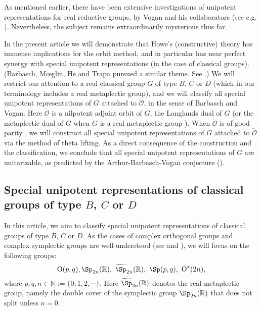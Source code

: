 \documentclass[12pt,a4paper]{amsart}
\newcommand{\BN}{{\mathbb {N}}}
\newcommand{\CO}{{\mathcal {O}}}
\newcommand{\oO}{\operatorname{O}}
\newcommand{\R}{\mathbb R}
\newcommand{\be}{\begin {equation}}
\newcommand{\ee}{\end {equation}}
\numberwithin{equation}{section}
\theoremstyle{remark}
\begin{document}
As mentioned earlier, there have been extensive investigations of unipotent representations for real reductive
groups, by Vogan and his collaborators (see e.g. \cite{VoBook,Vo89,ABV}). Nevertheless, the subject remains extraordinarily mysterious thus far.


In the present article we will demonstrate that Howe's (constructive) theory has immense implications for the orbit method, and in particular
has near perfect synergy with special unipotent representations (in the case of classical groups). (Barbasch, M{\oe}glin, He and Trapa pursued a similar theme. See
\cite{B17,Mo17,He,Tr}.) We will restrict our attention to a real classical group
$G$ of type $B$, $C$ or $D$ (which in our terminology includes a real metaplectic group),
and we will classify all special unipotent representations of $G$ attached to $\check \CO$, in the sense of Barbasch and
Vogan. Here $\check \CO$ is a nilpotent adjoint orbit of $\check G$, the Langlands dual of $G$ (or the metaplectic dual of $G$ when $G$ is a real metaplectic group \cite{BMSZ1}).
When $\check \CO$ is of good parity \cite{MR}, we will construct all special unipotent representations of $G$ attached to $\check \CO$ via the method of theta lifting.
As a direct consequence of the construction and the classification, we conclude that all special unipotent representations of $G$ are unitarizable, as predicted by the Arthur-Barbasch-Vogan conjecture (\cite[Introduction]{ABV}).


\subsection{Special unipotent representations of classical groups of type $B$, $C$ or $D$}\label{secsu}
In this article, we aim to classify special unipotent representations of classical groups of type $B$, $C$ or $D$. As the cases of complex orthogonal groups  and complex symplectic groups are well-understood (see
\cite{BVUni} and \cite{B17}), we will focus on the following groups:
\be\label{typebcd}
  \oO(p,q), \Sp_{2n}(\R), \  \widetilde \Sp_{2n}(\R), \ \Sp(p,q), \  \oO^*(2n),
  \ee
  where $p,q, n\in \BN:=\{0,1,2, \cdots\}$. Here $ \widetilde \Sp_{2n}(\R)$ denotes the real metaplectic group, namely the double cover of the symplectic group  $\Sp_{2n}(\R)$ that does not split unless $n=0$.
\end{document}
